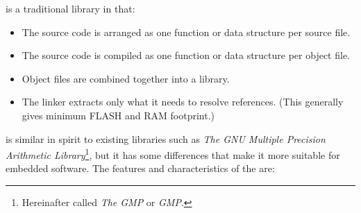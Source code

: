 \emph{\productbasenameshort{}} is a traditional
library in that:

\begin{itemize}
\item The source code is arranged as one function or data structure per source file.
\item The source code is compiled as one function or data structure per object file.
\item Object files are combined together into a library.
\item The linker extracts only what it needs to resolve references.  (This generally
      gives minimum FLASH and RAM footprint.)
\end{itemize}

\emph{\productbasenameshort{}} is similar in spirit to 
existing libraries such as \emph{The GNU Multiple Precision 
Arithmetic Library}\footnote{Hereinafter called \emph{The 
GMP} or \emph{GMP}.}, but it has some differences that make 
it more suitable for embedded software.  The features and 
characteristics of the \emph{\productbasenameshort{}} are: 

